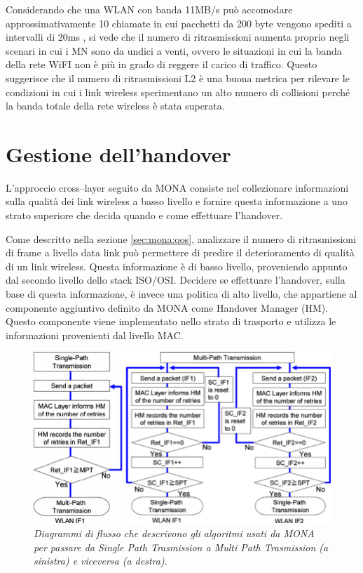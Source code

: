 \documentclass[12pt,a4paper,openright,twoside]{book}
\begin{document}
Considerando che una WLAN con banda 11MB/s può accomodare
approssimativamente 10 chiamate in cui pacchetti da 200 byte vengono
spediti a intervalli di 20ms \cite{bib:banda-wlan}, si vede che il
numero di ritrasmissioni aumenta proprio negli scenari in cui i MN
sono da undici a venti, ovvero le situazioni in cui la banda della
rete WiFI non è più in grado di reggere il carico di traffico. Questo
suggerisce che il numero di ritrasmissioni L2 è una buona metrica per
rilevare le condizioni in cui i link wireless sperimentano un alto
numero di collisioni perché la banda totale della rete wireless è
stata superata.

\section{Gestione dell'handover}

L'approccio cross--layer seguito da MONA consiste nel collezionare
informazioni sulla qualità dei link wireless a basso livello e fornire
questa informazione a uno strato superiore che decida quando e come
effettuare l'handover.

Come descritto nella sezione \ref{sec:mona:qos}, analizzare il numero
di ritrasmissioni di frame a livello data link può permettere di
predire il deterioramento di qualità di un link wireless. Questa
informazione è di basso livello, proveniendo appunto dal secondo
livello dello stack ISO/OSI. Decidere se effettuare l'handover, sulla
base di questa informazione, è invece una politica di alto livello,
che appartiene al componente aggiuntivo definito da MONA come Handover
Manager (HM). Questo componente viene implementato nello strato di
trasporto e utilizza le informazioni provenienti dal livello MAC.

\begin{figure}
  \centering
  \includegraphics[width=12cm]{img/mona-sp-mp}
  \caption{\em Diagrammi di flusso che descrivono gli algoritmi usati da
    MONA per passare da Single Path Trasmission a Multi Path Trasmission
    (a sinistra) e viceversa (a destra).}
  \label{fig:mona:sp-mp}
\end{figure}
\end{document}
